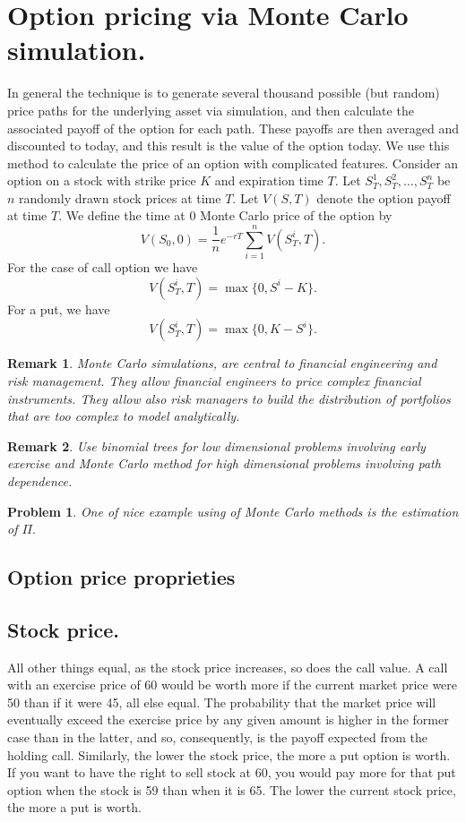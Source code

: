 \documentclass{book}
\newtheorem{remark}{Remark}[section]
\newtheorem{problem}{Problem}[section]
\begin{document}
\section{Option pricing via Monte Carlo simulation.}
In general the technique is to generate several thousand possible (but random) price paths for the underlying asset via simulation, and then calculate the associated payoff of the option for each path. These payoffs are then averaged and discounted to today, and this result is the value of the option today. We use this method to calculate the price of an option with complicated features.
Consider an option on a stock with strike price $K$ and expiration time $T$. Let $S_{T}^{1},S_{T}^{2},\dots,S_{T}^{n}$ be $n$ randomly drawn stock prices at time $T$. Let $V(S,T)$ denote the option payoff at time $T$. We define the time at $0$ Monte Carlo price of the option by
$$
V(S_{0},0)=\frac{1}{n}e^{-rT}\sum_{i=1}^{n}V(S^{i}_{T},T).
$$
For the case of call option we have 
$$
V(S^{i}_{T},T)=\max\{0,S^{i}-K\}.
$$
For a put, we have 
$$
V(S^{i}_{T},T)=\max\{0,K-S^{i}\}.
$$
\begin{remark}
Monte Carlo simulations, are central to financial engineering and risk management. They allow financial engineers to price complex financial instruments. They allow also risk managers to build the distribution of portfolios that are too complex to model analytically.
\end{remark}
\begin{remark}
Use binomial trees for low dimensional problems involving early exercise and Monte Carlo method for high dimensional problems involving path dependence.
\end{remark}
\begin{problem}
One of nice example using of Monte Carlo methods is the estimation of $\Pi.$ 
\end{problem}
\subsection{Option price proprieties}
\subsection{Stock price.}
All other things equal, as the stock price increases, so does the call value. A call with an
exercise price of 60 would be worth more if the current market price were 50 than if it were 45, all else equal. The probability that the market price will eventually exceed the exercise price by any given amount is higher in the former case than in the latter, and so, consequently, is the payoff expected from the holding call. Similarly, the lower the stock price, the more a put option is worth. If you want to have the right to sell stock at 60, you would pay more for that put option when the stock is 59 than when it is 65. The lower the current stock price, the more a put is worth.
\end{document}
